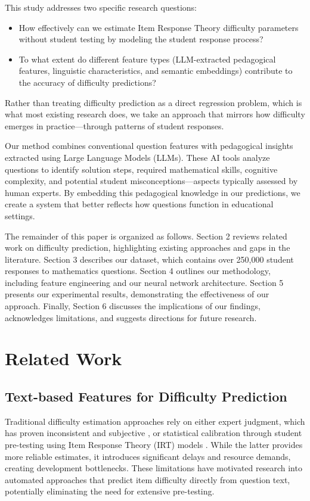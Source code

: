 \documentclass[11pt]{article}
\begin{document}
This study addresses two specific research questions:
\begin{itemize}
    \item How effectively can we estimate Item Response Theory difficulty parameters without student testing by modeling the student response process?
    \item To what extent do different feature types (LLM-extracted pedagogical features, linguistic characteristics, and semantic embeddings) contribute to the accuracy of difficulty predictions?
\end{itemize}

Rather than treating difficulty prediction as a direct regression problem, which is what most existing research does, we take an approach that mirrors how difficulty emerges in practice—through patterns of student responses.

Our method combines conventional question features with pedagogical insights extracted using Large Language Models (LLMs). These AI tools analyze questions to identify solution steps, required mathematical skills, cognitive complexity, and potential student misconceptions—aspects typically assessed by human experts. By embedding this pedagogical knowledge in our predictions, we create a system that better reflects how questions function in educational settings.

The remainder of this paper is organized as follows. Section 2 reviews related work on difficulty prediction, highlighting existing approaches and gaps in the literature. Section 3 describes our dataset, which contains over 250,000 student responses to mathematics questions. Section 4 outlines our methodology, including feature engineering and our neural network architecture. Section 5 presents our experimental results, demonstrating the effectiveness of our approach. Finally, Section 6 discusses the implications of our findings, acknowledges limitations, and suggests directions for future research.

\section{Related Work}

\subsection{Text-based Features for Difficulty Prediction}

Traditional difficulty estimation approaches rely on either expert judgment, which has proven inconsistent and subjective \citep{rudner2010implementing, impara1998teachers}, or statistical calibration through student pre-testing using Item Response Theory (IRT) models \citep{rasch1960}. While the latter provides more reliable estimates, it introduces significant delays and resource demands, creating development bottlenecks. These limitations have motivated research into automated approaches that predict item difficulty directly from question text, potentially eliminating the need for extensive pre-testing.
\end{document}
